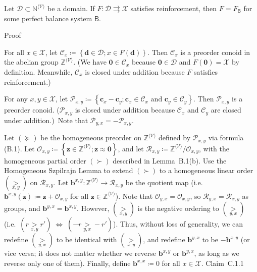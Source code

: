 \documentclass[
]{article}
\begin{document}
Let \(\mathcal{D} \subset \mathbb{N}^{\langle\mathcal{V}\rangle}\) be a
domain. If \(\left. F:\mathcal{D}\rightrightarrows\mathcal{X} \right.\)
satisfies reinforcement, then \(F = F_{\mathsf{B}}\) for some perfect
balance system \(\mathsf{B}\).

Proof

For all \(x \in \mathcal{X}\), let
\(\mathcal{C}_{x} ≔ \left\{ \mathbf{d} \in \mathcal{D};x \in F\left( \mathbf{d} \right) \right\}\).
Then \(\mathcal{C}_{x}\) is a preorder conoid in the abelian group
\(\mathbb{Z}^{\langle\mathcal{V}\rangle}\). (We have
\(\mathbf{0} \in \mathcal{C}_{x}\) because
\(\mathbf{0} \in \mathcal{D}\) and
\(F\left( \mathbf{0} \right) = \mathcal{X}\) by definition. Meanwhile,
\(\mathcal{C}_{x}\) is closed under addition because \(F\) satisfies
reinforcement.)

For any \(x,y \in \mathcal{X}\), let
\(\mathcal{P}_{x,y} ≔ \left\{ \mathbf{c}_{x} - \mathbf{c}_{y};\mathbf{c}_{x} \in \mathcal{C}_{x}\text{~and~}\mathbf{c}_{y} \in \mathcal{C}_{y} \right\}\).
Then \(\mathcal{P}_{x,y}\) is a preorder conoid. (\(\mathcal{P}_{x,y}\)
is closed under addition because \(\mathcal{C}_{x}\) and
\(\mathcal{C}_{y}\) are closed under addition.)~Note that
\(\mathcal{P}_{y,x} = - \mathcal{P}_{x,y}\).

Let \(( \succeq )\) be the homogeneous preorder on
\(\mathbb{Z}^{\langle\mathcal{V}\rangle}\) defined by
\(\mathcal{P}_{x,y}\) via formula (B.1). Let
\(\mathcal{O}_{x,y} ≔ \left\{ \mathbf{z} \in \mathbb{Z}^{\langle\mathcal{V}\rangle};\mathbf{z} \approx \mathbf{0} \right\}\),
and let
\(\mathcal{R}_{x,y} ≔ \mathbb{Z}^{\langle\mathcal{V}\rangle}/\mathcal{O}_{x,y}\),
with the homogeneous partial order \(( \succ )\) described in
Lemma~B.1(b). Use the Homogeneous Szpilrajn Lemma to extend
\(( \succ )\) to a homogeneous linear order
\(\left( \underset{x,y}{>} \right)\) on \(\mathcal{R}_{x,y}\). Let
\(\left. \mathbf{b}^{x,y}:\mathbb{Z}^{\langle\mathcal{V}\rangle}\longrightarrow\mathcal{R}_{x,y} \right.\)
be the quotient map
(i.e.~\(\mathbf{b}^{x,y}\left( \mathbf{z} \right) ≔ \mathbf{z} + \mathcal{O}_{x,y}\)
for all \(\mathbf{z} \in \mathbb{Z}^{\langle\mathcal{V}\rangle}\)). Note
that \(\mathcal{O}_{y,x} = \mathcal{O}_{x,y}\), so
\(\mathcal{R}_{y,x} = \mathcal{R}_{x,y}\) as groups, and
\(\mathbf{b}^{y,x} = \mathbf{b}^{x,y}\). However,
\(\left( \underset{x,y}{>} \right)\) is the negative ordering to
\(\left( \underset{y,x}{>} \right)\)
(i.e.~\(\left. \left( r\underset{x,y}{>}r' \right)\;\Longleftrightarrow\;\left( - r\underset{y,x}{>} - r' \right) \right.\)).
Thus, without loss of generality, we can redefine
\(\left( \underset{y,x}{>} \right)\) to be identical with
\(\left( \underset{x,y}{>} \right)\), and redefine \(\mathbf{b}^{y,x}\)
to be \(- \mathbf{b}^{x,y}\) (or vice versa; it does not matter whether
we reverse \(\mathbf{b}^{x,y}\) or \(\mathbf{b}^{y,x}\), as long as we
reverse only one of them). Finally, define \(\mathbf{b}^{x,x} ≔ 0\) for
all \(x \in \mathcal{X}\). Claim~C.1.1
\end{document}
